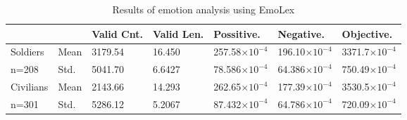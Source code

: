 \begin{table}[h]
  \caption{Results of emotion analysis using EmoLex}
  \label{table:emolexResult}
  \centering
  \renewcommand{\tabularxcolumn}{m} %
  \begin{tabularx}{\textwidth}{l l | l l l l l}
    \toprule
              &         & \textbf{Valid Cnt.} & \textbf{Valid Len.}    & \textbf{Possitive.}    & \textbf{Negative.}     & \textbf{Objective.}
    \tabularnewline \midrule
    Soldiers  & Mean
              & 3179.54 & 16.450              & 257.58$\times 10^{-4}$ & 196.10$\times 10^{-4}$ & 3371.7$\times 10^{-4}$
    \tabularnewline
    n=208     & Std.
              & 5041.70 & 6.6427              & 78.586$\times 10^{-4}$ & 64.386$\times 10^{-4}$ & 750.49$\times 10^{-4}$
    \tabularnewline \hline \hline
    Civilians & Mean
              & 2143.66 & 14.293              & 262.65$\times 10^{-4}$ & 177.39$\times 10^{-4}$ & 3530.5$\times 10^{-4}$
    \tabularnewline
    n=301     & Std.
              & 5286.12 & 5.2067              & 87.432$\times 10^{-4}$ & 64.786$\times 10^{-4}$ & 720.09$\times 10^{-4}$
    \tabularnewline \bottomrule
  \end{tabularx}
\end{table}
